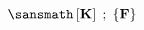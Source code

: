 \documentclass[preview]{standalone}
\begin{document}
$ \displaystyle \sansmath
 \left[ \mathbf{K} \right] \; ; \; \left\lbrace \mathbf{F} \right\rbrace
$
\end{document}
